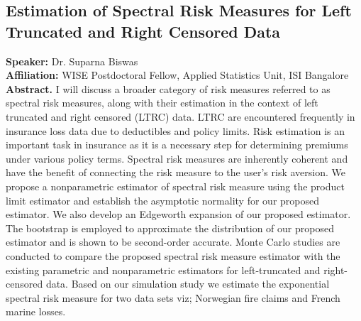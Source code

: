 \subsection*{Estimation of Spectral Risk Measures for Left Truncated and Right Censored Data} %
\noindent
\textbf{Speaker:} Dr. Suparna Biswas \\ %
\textbf{Affiliation:} WISE Postdoctoral Fellow, Applied Statistics Unit, ISI Bangalore \\ %

\noindent\textbf{Abstract.} I will discuss a broader category of risk measures referred to as spectral risk measures, along with their estimation in the context of left truncated and right censored (LTRC) data. LTRC are encountered frequently in insurance loss data due to deductibles and policy limits. Risk estimation is an important task in insurance as it is a necessary step for determining premiums under various policy terms. Spectral risk measures are inherently coherent and have the benefit of connecting the risk measure to the user's risk aversion. We propose a nonparametric estimator of spectral risk measure using the product limit estimator and establish the asymptotic normality for our proposed estimator. We also develop an Edgeworth expansion of our proposed estimator. The bootstrap is employed to approximate the distribution of our proposed estimator and is shown to be second-order accurate. Monte Carlo studies are conducted to compare the proposed spectral risk measure estimator with the existing parametric and nonparametric estimators for left-truncated and right-censored data. Based on our simulation study we estimate the exponential spectral risk measure for two data sets viz; Norwegian fire claims and French marine losses.


